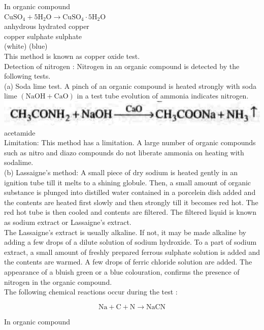 \documentclass[10pt]{article}
\begin{document}
In organic compound\\
$\mathrm{CuSO}_{4}+5 \mathrm{H}_{2} \mathrm{O} \longrightarrow \mathrm{CuSO}_{4} \cdot 5 \mathrm{H}_{2} \mathrm{O}$\\
anhydrous hydrated copper\\
copper sulphate sulphate\\
(white) (blue)\\
This method is known as copper oxide test.\\
Detection of nitrogen : Nitrogen in an organic compound is detected by the following tests.\\
(a) Soda lime test. A pinch of an organic compound is heated strongly with soda lime $(\mathrm{NaOH}+\mathrm{CaO})$ in a test tube evolution of ammonia indicates nitrogen.\\
\includegraphics[max width=\textwidth, center]{2025_01_28_8470952b98110cec3aabg-106(2)}\\
acetamide\\
Limitation: This method has a limitation. A large number of organic compounds such as nitro and diazo compounds do not liberate ammonia on heating with sodalime.\\
(b) Lassaigne's method: A small piece of dry sodium is heated gently in an ignition tube till it melts to a shining globule. Then, a small amount of organic substance is plunged into distilled water contained in a porcelein dish added and the contents are heated first slowly and then strongly till it becomes red hot. The red hot tube is then cooled and contents are filtered. The filtered liquid is known as sodium extract or Lassaigne's extract.\\
The Lassaigne's extract is usually alkaline. If not, it may be made alkaline by adding a few drops of a dilute solution of sodium hydroxide. To a part of sodium extract, a small amount of freshly prepared ferrous sulphate solution is added and the contents are warmed. A few drops of ferric chloride solution are added. The appearance of a bluish green or a blue colouration, confirms the presence of nitrogen in the organic compound.\\
The following chemical reactions occur during the test :

$$
\mathrm{Na}+\mathrm{C}+\mathrm{N} \longrightarrow \mathrm{NaCN}
$$

In organic compound
\end{document}
